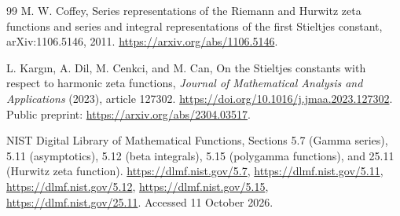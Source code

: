 \begin{thebibliography}{99}
M. W. Coffey, Series representations of the Riemann and Hurwitz zeta
functions and series and integral representations of the first
Stieltjes constant, arXiv:1106.5146, 2011.
\url{https://arxiv.org/abs/1106.5146}.

L. Karg\i n, A. Dil, M. Cenkci, and M. Can,
On the Stieltjes constants with respect to harmonic zeta functions,
\emph{Journal of Mathematical Analysis and Applications} (2023),
article 127302.
\url{https://doi.org/10.1016/j.jmaa.2023.127302}.
Public preprint: \url{https://arxiv.org/abs/2304.03517}.

NIST Digital Library of Mathematical Functions,
Sections 5.7 (Gamma series), 5.11 (asymptotics), 5.12 (beta integrals),
5.15 (polygamma functions), and 25.11 (Hurwitz zeta function).
\url{https://dlmf.nist.gov/5.7},
\url{https://dlmf.nist.gov/5.11},
\url{https://dlmf.nist.gov/5.12},
\url{https://dlmf.nist.gov/5.15},
\url{https://dlmf.nist.gov/25.11}.
Accessed 11 October 2026.

\end{thebibliography}
